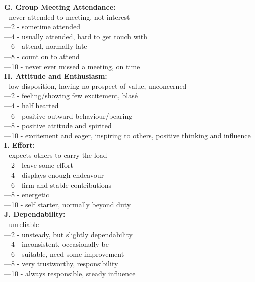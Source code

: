 \documentclass[11pt]{article}
\begin{document}
\textbf{G. Group Meeting Attendance:}\\
	\indent{}	- never attended to meeting, not interest\\
	\indent{}—2	- sometime attended \\
	\indent{}—4	- usually attended, hard to get touch with\\
	\indent{}—6	- attend, normally late\\
	\indent{}—8	- count on to attend\\
	\indent{}—10	- never ever missed a meeting, on time\\

\textbf{H. Attitude and Enthusiasm:}\\
	\indent{}	- low disposition, having no prospect of value, unconcerned \\
	\indent{}—2	- feeling/showing few excitement, blasé\\
	\indent{}—4	- half hearted \\
	\indent{}—6	- positive outward behaviour/bearing\\
	\indent{}—8	- positive attitude and spirited\\
	\indent{}—10	- excitement and eager, inspiring to others, positive thinking and influence\\

\textbf{I. Effort:}\\
	\indent{}	- expects others to carry the load\\
	\indent{}—2	- leave some effort\\
	\indent{}—4	- displays enough endeavour\\
	\indent{}—6	- firm and stable contributions\\
	\indent{}—8	- energetic\\
	\indent{}—10	- self starter, normally beyond duty\\

\textbf{J. Dependability:}\\ 
	\indent{}	- unreliable\\
	\indent{}—2	- unsteady, but slightly dependability \\
	\indent{}—4	- inconsistent, occasionally be\\
	\indent{}—6	- suitable, need some improvement \\
	\indent{}—8	- very trustworthy, responsibility \\
	\indent{}—10	- always responsible, steady influence \\
\end{document}
